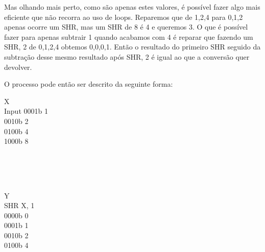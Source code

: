 \documentclass{article}
\begin{document}
\bigbreak

Mas olhando mais perto, como são apenas estes valores, é possível fazer algo mais eficiente que não recorra ao uso de loops. Reparemos que de 1,2,4 para 0,1,2 apenas ocorre um SHR, mas um SHR de 8 é 4 e queremos 3. O que é possível fazer para apenas subtrair 1 quando acabamos com 4 é reparar que fazendo um SHR, 2 de 0,1,2,4 obtemos 0,0,0,1. Então o resultado do primeiro SHR seguido da subtração desse mesmo resultado após SHR, 2 é igual ao que a conversão quer devolver.

\bigbreak

O processo pode então ser descrito da seguinte forma:
\begin{center}
    \begin{minipage}{1.5cm}
        \begin{center}
            X \\
            Input
            0001b 1 \\
            0010b 2 \\
            0100b 4 \\
            1000b 8
        \end{center}
    \end{minipage}
    \begin{minipage}{0.5cm}
        \begin{center}
            \vspace{1.1cm}
            \textrightarrow \\
            \textrightarrow \\
            \textrightarrow \\
            \textrightarrow
        \end{center}
    \end{minipage}
    \begin{minipage}{1.5cm}
        \begin{center}
            Y \\
            SHR X, 1 \\
            0000b 0 \\
            0001b 1 \\
            0010b 2 \\
            0100b 4
        \end{center}
    \end{minipage}
    \begin{minipage}{0.5cm}
        \begin{center}
            \vspace{1.1cm}
            \textrightarrow \\

\end{center}
\end{minipage}
\end{center}
\end{document}
